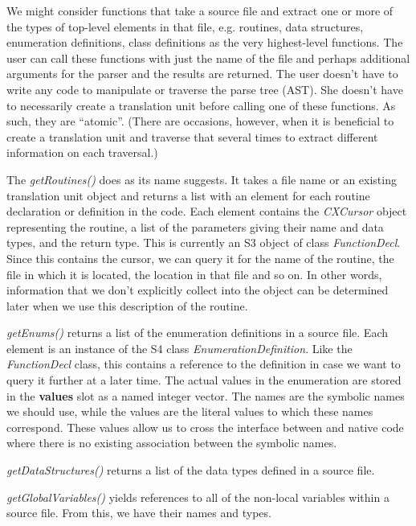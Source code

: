 \documentclass[article]{jss}
\def\Cpp{\proglang{C$++$}}
\def\R{\proglang{R}}
\def\Rfunc#1{\textsl{#1()}}
\def\Rclass#1{\textit{#1}}
\def\Rslot#1{\textbf{#1}}
\begin{document}

We might consider functions that take a source file and extract one or
more of the types of top-level elements in that file, e.g. routines,
data structures, enumeration definitions, \Cpp{} class definitions as
the very highest-level functions.  The \R{} user can call these
functions with just the name of the file and perhaps additional
arguments for the parser and the results are returned.  The user
doesn't have to write any code to manipulate or traverse the parse
tree (AST).  She doesn't have to necessarily create a translation unit
before calling one of these functions. As such, they are ``atomic''.
(There are occasions, however, when it is beneficial to create a
translation unit and traverse that several times to extract different
information on each traversal.)

The \Rfunc{getRoutines} does as its name suggests. It takes a file
name or an existing translation unit object and returns a list with an
element for each routine declaration or definition in the code.  Each
element contains the \Rclass{CXCursor} object representing the
routine, a list of the parameters giving their name and data types,
and the return type.  This is currently an S3 object of class
\Rclass{FunctionDecl}. Since this contains the cursor, we can query it
for the name of the routine, the file in which it is located, the
location in that file and so on. In other words, information that
we don't explicitly collect into the \R{} object can be determined
later when we use this description of the routine.

\Rfunc{getEnums} returns a list of the enumeration definitions in a
source file. Each element is an instance of the S4 class
\Rclass{EnumerationDefinition}.  Like the \Rclass{FunctionDecl} class,
this contains a reference to the definition in case we want to query
it further at a later time.  The actual values in the enumeration are
stored in the \Rslot{values} slot as a named integer vector.  The
names are the symbolic names we should use, while the values are the
literal values to which these names correspond.  These values allow us
to cross the interface between \R{} and native code where there is no
existing  association between the symbolic names.

\Rfunc{getDataStructures} returns a list of the data types defined in
a source file.


\Rfunc{getGlobalVariables} yields references to all of the non-local
variables within a source file.  From this, we have their names and
types.
\end{document}

